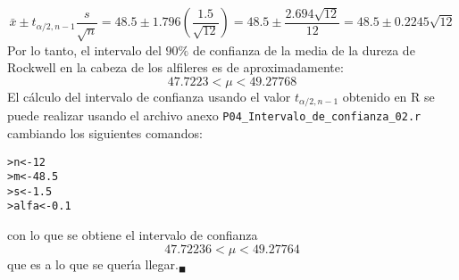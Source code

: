 \begin{solucion}
 \begin{equation*}
  \bar{x} \pm t_{\alpha/2,n-1}\frac{s}{\sqrt{n}} = 48.5\pm 1.796\left( \frac{1.5}{\sqrt{12}} \right) = 48.5\pm \frac{2.694\sqrt{12}}{12} = 48.5\pm 0.2245\sqrt{12}
 \end{equation*}
 Por lo tanto, el intervalo del $90\%$ de confianza de la media de la dureza de Rockwell en la cabeza de los alfileres es de aproximadamente:
 \begin{equation*}
  47.7223 < \mu < 49.27768
 \end{equation*}
 El c\'alculo del intervalo de confianza usando el valor $t_{\alpha/2,n-1}$ obtenido en R se puede realizar usando el archivo anexo \texttt{P04\_Intervalo\_de\_confianza\_02.r} cambiando los siguientes comandos:
 \begin{verbatim}
>n<-12
>m<-48.5
>s<-1.5
>alfa<-0.1
 \end{verbatim}
 \vspace{-0.5cm}
 con lo que se obtiene el intervalo de confianza
 \begin{equation*}
  47.72236 < \mu < 49.27764
 \end{equation*}
 que es a lo que se quer\'{\i}a llegar.${}_{\blacksquare}$
\end{solucion}
